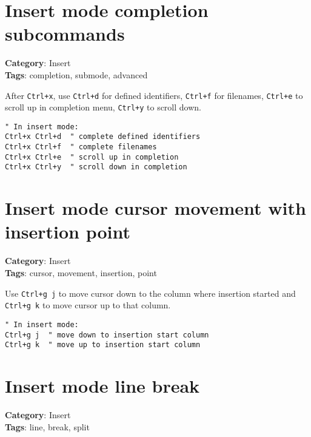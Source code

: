 {{{{{{\section{Insert mode completion subcommands}

\textbf{Category}: Insert\\ \textbf{Tags}: completion, submode, advanced
\vspace{0.5cm}

After {\footnotesize \Verb§Ctrl+x§}, use {\footnotesize \Verb§Ctrl+d§} for defined identifiers, {\footnotesize \Verb§Ctrl+f§} for filenames, {\footnotesize \Verb§Ctrl+e§} to scroll up in completion menu, {\footnotesize \Verb§Ctrl+y§} to scroll down.

\begin{Exa*}{}
\begin{Verbatim}[fontsize=\footnotesize, breaklines, breakanywhere]
" In insert mode:
Ctrl+x Ctrl+d  " complete defined identifiers  
Ctrl+x Ctrl+f  " complete filenames
Ctrl+x Ctrl+e  " scroll up in completion
Ctrl+x Ctrl+y  " scroll down in completion
\end{Verbatim}
\end{Exa*}

\section{Insert mode cursor movement with insertion point}

\textbf{Category}: Insert\\ \textbf{Tags}: cursor, movement, insertion, point
\vspace{0.5cm}

Use {\footnotesize \Verb§Ctrl+g j§} to move cursor down to the column where insertion started and {\footnotesize \Verb§Ctrl+g k§} to move cursor up to that column.

\begin{Exa*}{}
\begin{Verbatim}[fontsize=\footnotesize, breaklines, breakanywhere]
" In insert mode:
Ctrl+g j  " move down to insertion start column
Ctrl+g k  " move up to insertion start column
\end{Verbatim}
\end{Exa*}

\section{Insert mode line break}

\textbf{Category}: Insert\\ \textbf{Tags}: line, break, split
\vspace{0.5cm}

}}}}}}
